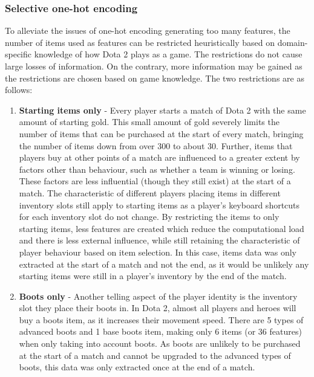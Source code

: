 \documentclass[Report.tex]{subfiles}
\begin{document}
\subsubsection{Selective one-hot encoding}
To alleviate the issues of one-hot encoding generating too many features, the number of items used as features can be restricted heuristically based on domain-specific knowledge of how Dota 2 plays as a game. The restrictions do not cause large losses of information. On the contrary, more information may be gained as the restrictions are chosen based on game knowledge. The two restrictions are as follows:
\begin{enumerate}
\item \textbf{Starting items only} - Every player starts a match of Dota 2 with the same amount of starting gold. This small amount of gold severely limits the number of items that can be purchased at the start of every match, bringing the number of items down from over 300 to about 30. Further, items that players buy at other points of a match are influenced to a greater extent by factors other than behaviour, such as whether a team is winning or losing. These factors are less influential (though they still exist) at the start of a match. The characteristic of different players placing items in different inventory slots still apply to starting items as a player's keyboard shortcuts for each inventory slot do not change. By restricting the items to only starting items, less features are created which reduce the computational load and there is less external influence, while still retaining the characteristic of player behaviour based on item selection. In this case, items data was only extracted at the start of a match and not the end, as it would be unlikely any starting items were still in a player's inventory by the end of the match. 

\item \textbf{Boots only} - Another telling aspect of the player identity is the inventory slot they place their boots in. In Dota 2, almost all players and heroes will buy a boots item, as it increases their movement speed. There are 5 types of advanced boots and 1 base boots item, making only 6 items (or 36 features) when only taking into account boots. As boots are unlikely to be purchased at the start of a match and cannot be upgraded to the advanced types of boots, this data was only extracted once at the end of a match. 
\end{enumerate}

\end{document}
